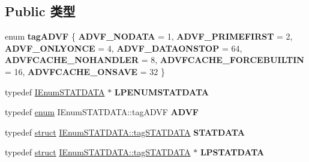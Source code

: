 \subsection*{Public 类型}
\begin{DoxyCompactItemize}
\item 
\mbox{\label{interface_i_enum_s_t_a_t_d_a_t_a_add03341684b8ba3da67492d8e67d38da}} 
enum {\bfseries tag\+A\+D\+VF} \{ \newline
{\bfseries A\+D\+V\+F\+\_\+\+N\+O\+D\+A\+TA} = 1, 
{\bfseries A\+D\+V\+F\+\_\+\+P\+R\+I\+M\+E\+F\+I\+R\+ST} = 2, 
{\bfseries A\+D\+V\+F\+\_\+\+O\+N\+L\+Y\+O\+N\+CE} = 4, 
{\bfseries A\+D\+V\+F\+\_\+\+D\+A\+T\+A\+O\+N\+S\+T\+OP} = 64, 
\newline
{\bfseries A\+D\+V\+F\+C\+A\+C\+H\+E\+\_\+\+N\+O\+H\+A\+N\+D\+L\+ER} = 8, 
{\bfseries A\+D\+V\+F\+C\+A\+C\+H\+E\+\_\+\+F\+O\+R\+C\+E\+B\+U\+I\+L\+T\+IN} = 16, 
{\bfseries A\+D\+V\+F\+C\+A\+C\+H\+E\+\_\+\+O\+N\+S\+A\+VE} = 32
 \}
\item 
\mbox{\label{interface_i_enum_s_t_a_t_d_a_t_a_a04995558459ff9a876deb3ff3de3e013}} 
typedef \hyperlink{interface_i_enum_s_t_a_t_d_a_t_a}{I\+Enum\+S\+T\+A\+T\+D\+A\+TA} $\ast$ {\bfseries L\+P\+E\+N\+U\+M\+S\+T\+A\+T\+D\+A\+TA}
\item 
\mbox{\label{interface_i_enum_s_t_a_t_d_a_t_a_a4617444b868240d2a04ecbbbce229954}} 
typedef \hyperlink{interfaceenum}{enum} I\+Enum\+S\+T\+A\+T\+D\+A\+T\+A\+::tag\+A\+D\+VF {\bfseries A\+D\+VF}
\item 
\mbox{\label{interface_i_enum_s_t_a_t_d_a_t_a_aefdaccfe6610bde8a38b73e8b440a0a9}} 
typedef \hyperlink{interfacestruct}{struct} \hyperlink{struct_i_enum_s_t_a_t_d_a_t_a_1_1tag_s_t_a_t_d_a_t_a}{I\+Enum\+S\+T\+A\+T\+D\+A\+T\+A\+::tag\+S\+T\+A\+T\+D\+A\+TA} {\bfseries S\+T\+A\+T\+D\+A\+TA}
\item 
\mbox{\label{interface_i_enum_s_t_a_t_d_a_t_a_a43b968220a9e624bec91c09ff3ca7dba}} 
typedef \hyperlink{interfacestruct}{struct} \hyperlink{struct_i_enum_s_t_a_t_d_a_t_a_1_1tag_s_t_a_t_d_a_t_a}{I\+Enum\+S\+T\+A\+T\+D\+A\+T\+A\+::tag\+S\+T\+A\+T\+D\+A\+TA} $\ast$ {\bfseries L\+P\+S\+T\+A\+T\+D\+A\+TA}
\end{DoxyCompactItemize}
